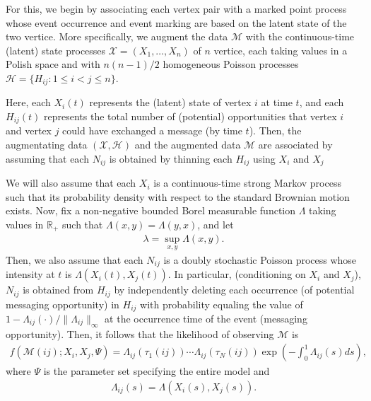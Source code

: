 \documentclass[12pt]{article}%
\begin{document}
For this, we begin by associating each vertex pair with a marked point process whose 
event occurrence and event marking are based on the latent state of the two vertice. 
More specifically, we augment the data $\mathcal M$ with 
the continuous-time (latent) state processes $\mathcal X = (X_1,\ldots, X_n)$ of $n$ vertice,
each taking values in a Polish space and with $n(n-1)/2$ homogeneous Poisson processes 
$\mathcal H= \{H_{ij} : 1 \le i < j \le n\}$.  

Here, each $X_i(t)$ represents the (latent) state of vertex $i$ at time $t$,
and each $H_{ij}(t)$ represents the total number of (potential) opportunities
that vertex $i$ and vertex $j$ could have exchanged a message (by time $t$).  
Then, the augmentating data $(\mathcal X, \mathcal H)$ and 
the augmented data $\mathcal M$ are associated by assuming that 
each $N_{ij}$ is obtained by  thinning each $H_{ij}$ using $X_i$ and $X_j$ 

We will also assume that each $X_i$ is a continuous-time strong Markov process 
such that its probability density with respect to the standard Brownian motion
exists.  
Now, fix a non-negative bounded Borel measurable function $\Lambda$ taking values in $\mathbb R_+$ such that $\Lambda(x,y) = \Lambda(y,x)$, and let
\begin{eqnarray}
\lambda = \sup_{x,y} \Lambda(x,y).
\end{eqnarray}
Then, we also assume that each $N_{ij}$ is a doubly stochastic Poisson process whose intensity at $t$  is 
$\Lambda(X_i(t),X_j(t))$.  
In particular, (conditioning on $X_i$ and $X_j$), $N_{ij}$ is obtained from $H_{ij}$ by independently deleting each occurrence (of potential messaging opportunity) in $H_{ij}$ with probability equaling the value of $1-\Lambda_{ij}(\cdot)/\|\Lambda_{ij}\|_\infty$ at the occurrence time of the event (messaging opportunity). 
Then, it follows that the likelihood of observing $\mathcal M$ is 
\begin{eqnarray}
f(\mathcal M(ij) ;X_i, X_j, \Psi) =  \Lambda_{ij}(\tau_1(ij)) \cdots \Lambda_{ij}(\tau_N(ij)) \exp\left(-\int_0^1 \Lambda_{ij}(s) ds\right),
\end{eqnarray}
where $\Psi$ is the parameter set specifying the entire model and 
\begin{eqnarray}
\Lambda_{ij}(s) = \Lambda(X_i(s),X_j(s)).
\end{eqnarray}  
\end{document}
